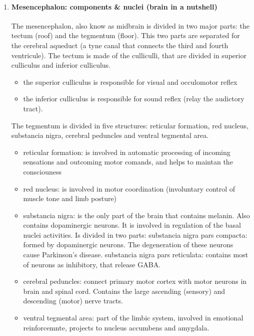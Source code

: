 \documentclass[12pt,article,oneside,a4paper]{memoir}
\begin{document}
\begin{enumerate}
\item \paragraph{Mesencephalon: components \& nuclei (brain in a nutshell)}\label{question:mesencephalon}
The mesencephalon, also know as midbrain is divided in two major parts: the tectum (roof) and the tegmentum (floor). This two parts are separated for the cerebral aqueduct (a tyne canal that connects the third and fourth ventricule).
The tectum is made of the culliculli, that are divided in superior culliculus and inferior culliculus.
\begin{itemize}
\item the superior culliculus is responsible for visual and occulomotor reflex 
\item the inferior culliculus is responsible for sound reflex (relay the audictory tract).
\end{itemize}
The tegmentum is divided in five structures: reticular formation, red nucleus, substancia nigra, cerebral peduncles and ventral tegmental area.
\begin{itemize}
\item reticular formation: is involved in automatic processing of incoming sensations and outcoming motor comands, and helps to maintan the consciouness
\item red nucleus: is involved in motor coordination (involuntary control of muscle tone and limb posture)
\item substancia nigra: is the only part of the brain that contains melanin. Also contains dopaminergic neurons. It is involved in regulation of the basal nuclei activities. Is divided in two parts:
\subitem substancia nigra pars compacta: formed by dopaminergic neurons. The degeneration of these neurons cause Parkinson's disease.
\subitem substancia nigra pars reticulata: contains most of neurons as inhibitory, that release GABA. 
\item cerebral peduncles: connect primary motor cortex with motor neurons in brain and spinal cord. Contains the large ascending (sensory) and descending (motor) nerve tracts.
\item ventral tegmental area: part of the limbic system, involved in emotional reinforcemnte, projects to nucleus accumbens and amygdala.
\end{itemize}


\end{enumerate}
\end{document}

